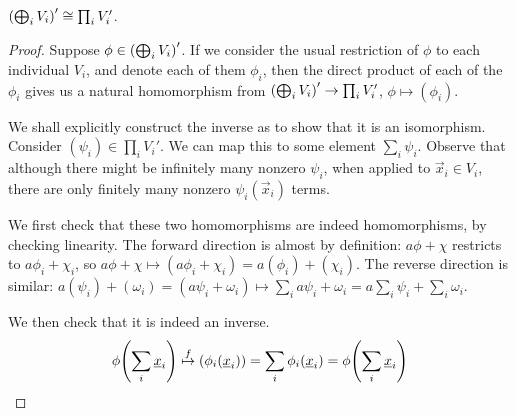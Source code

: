 \begin{proposition}
    \(\pqty{\bigoplus_i V_i}' \cong \prod_i V_i'\).
\end{proposition}
\begin{proof}
    Suppose \(\phi \in \pqty{\bigoplus_i V_i}'\).
    If we consider the usual restriction of \(\phi\) to each individual \(V_i\),
    and denote each of them \(\phi_i\),
    then the direct product of each of the \(\phi_i\)
    gives us a natural homomorphism
    from \(\pqty{\bigoplus_i V_i}' \to \prod_i V_i'\),
    \(\phi \mapsto (\phi_i)\).

    We shall explicitly construct the inverse as to show that it is an isomorphism.
    Consider \((\psi_i) \in \prod_i V_i'\).
    We can map this to some element \(\sum_i \psi_i\).
    Observe that although there might be infinitely many nonzero \(\psi_i\),
    when applied to \(\vec{x}_i \in V_i\), there are only finitely many nonzero \(\psi_i(\vec{x}_i)\) terms.

    We first check that these two homomorphisms are indeed homomorphisms,
    by checking linearity.
    The forward direction is almost by definition:
    \(a\phi + \chi\) restricts to \(a\phi_i + \chi_i\),
    so \(a\phi + \chi \mapsto (a\phi_i + \chi_i) = a(\phi_i) + (\chi_i)\).
    The reverse direction is similar:
    \(a(\psi_i) + (\omega_i) = (a\psi_i + \omega_i) \mapsto
    \sum_i a\psi_i + \omega_i = a\sum_i \psi_i + \sum_i \omega_i\).

    We then check that it is indeed an inverse.
    \begin{equation*}
        \phi\pqty{\sum_i \vec{x}_i} \overset{f}{\mapsto} (\phi_i(\vec{x}_i))
        = \sum_i \phi_i(\vec{x}_i) = \phi\pqty{\sum_i \vec{x}_i}
    \end{equation*}
\end{proof}

